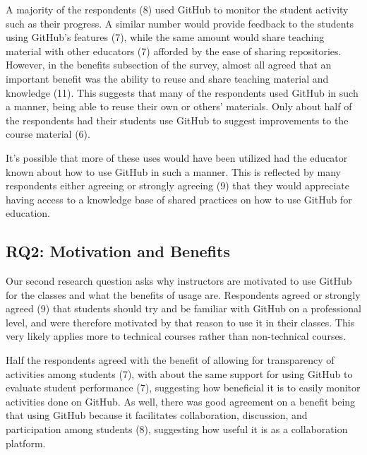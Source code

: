 A majority of the respondents (8) used GitHub to monitor the student activity such as their progress. A similar number would provide feedback to the students using GitHub's features (7), while the same amount would share teaching material with other educators (7) afforded by the ease of sharing repositories. However, in the benefits subsection of the survey, almost all agreed that an important benefit was the ability to reuse and share teaching material and knowledge (11). This suggests that many of the respondents used GitHub in such a manner, being able to reuse their own or others' materials. Only about half of the respondents had their students use GitHub to suggest improvements to the course material (6).

It's possible that more of these uses would have been utilized had the educator known about how to use GitHub in such a manner. This is reflected by many respondents either agreeing or strongly agreeing (9) that they would appreciate having access to a knowledge base of shared practices on how to use GitHub for education.

\subsection{RQ2: Motivation and Benefits}
Our second research question asks why instructors are motivated to use GitHub for the classes and what the benefits of usage are. Respondents agreed or strongly agreed (9) that students should try and be familiar with GitHub on a professional level, and were therefore motivated by that reason to use it in their classes. This very likely applies more to technical courses rather than non-technical courses.

Half the respondents agreed with the benefit of allowing for transparency of activities among students (7), with about the same support for using GitHub to evaluate student performance (7), suggesting how beneficial it is to easily monitor activities done on GitHub. As well, there was good agreement on a benefit being that using GitHub because it facilitates collaboration, discussion, and participation among students (8), suggesting how useful it is as a collaboration platform.

